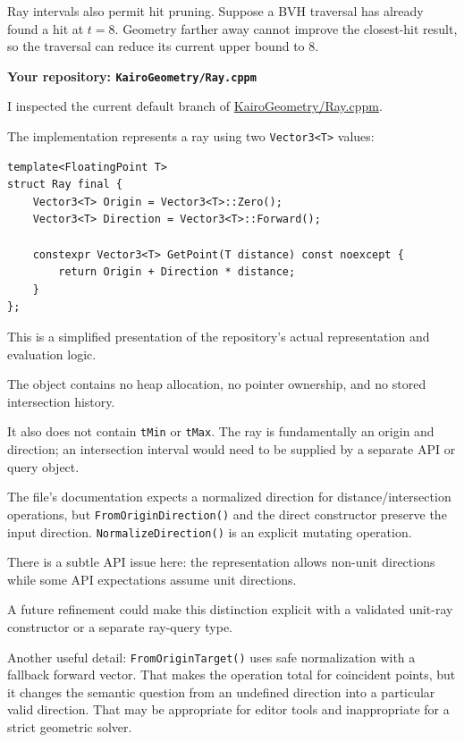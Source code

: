 Ray intervals also permit hit pruning. Suppose a BVH traversal has already found a hit at \(t=8\). Geometry farther away cannot improve the closest-hit result, so the traversal can reduce its current upper bound to \(8\).

\textbf{Your repository: \texttt{KairoGeometry/Ray.cppm}}

I inspected the current default branch of \href{https://github.com/swayam8624/KairoGeometry/blob/master/Ray.cppm?utm_source=chatgpt.com}{KairoGeometry/Ray.cppm}.

The implementation represents a ray using two \texttt{Vector3\textless{}T\textgreater{}} values:

\begin{verbatim}
template<FloatingPoint T>
struct Ray final {
    Vector3<T> Origin = Vector3<T>::Zero();
    Vector3<T> Direction = Vector3<T>::Forward();

    constexpr Vector3<T> GetPoint(T distance) const noexcept {
        return Origin + Direction * distance;
    }
};
\end{verbatim}

This is a simplified presentation of the repository's actual representation and evaluation logic.

The object contains no heap allocation, no pointer ownership, and no stored intersection history.

It also does not contain \texttt{tMin} or \texttt{tMax}. The ray is fundamentally an origin and direction; an intersection interval would need to be supplied by a separate API or query object.

The file's documentation expects a normalized direction for distance/intersection operations, but \texttt{FromOriginDirection()} and the direct constructor preserve the input direction. \texttt{NormalizeDirection()} is an explicit mutating operation.

There is a subtle API issue here: the representation allows non-unit directions while some API expectations assume unit directions.

A future refinement could make this distinction explicit with a validated unit-ray constructor or a separate ray-query type.

Another useful detail: \texttt{FromOriginTarget()} uses safe normalization with a fallback forward vector. That makes the operation total for coincident points, but it changes the semantic question from an undefined direction into a particular valid direction. That may be appropriate for editor tools and inappropriate for a strict geometric solver.

